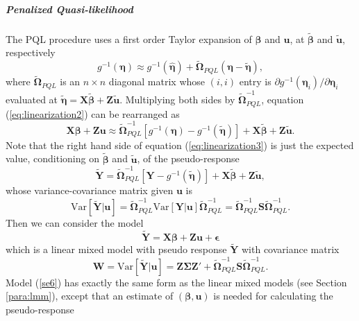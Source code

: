 \subparagraph*{Penalized Quasi-likelihood}
The PQL procedure uses a first order Taylor expansion of $\bm \beta$ and $\bm u$, at $\tilde{\bm
	\beta} $ and $ \tilde{\bm u} $, respectively
\begin{equation}\label{eq:linearization2}
	g^{-1}(\bm\eta) \approx g^{-1}(\hat{\bm \eta}) + \tilde{\bm \Omega}_{PQL}(\bm \eta-\tilde{\bm
		\eta}),
\end{equation} 
where $\tilde{\bm \Omega}_{PQL}$ is an $n\times n$ diagonal matrix whose $(i, i)$ entry is 
$\partial {g^{-1}(\bm \eta_i)}/\partial \bm \eta_i $ evaluated at $\tilde{\bm \eta}= \bm X\tilde{\bm
	\beta} + \bm Z\tilde{\bm u}$. Multiplying both sides by $\bm \tilde{\bm\Omega}_{PQL}^{-1}$,
equation
(\ref{eq:linearization2}) can be rearranged as 
\begin{equation}\label{eq:linearization3}
	\bm {X\beta} + \bm {Zu} \approx \tilde{\bm \Omega}_{PQL}^{-1}[g^{-1}(\bm\eta)- g^{-1}(\tilde{\bm
		\eta})]  + \bm{X}\tilde{\bm \beta} + \bm Z\tilde{\bm u}.
\end{equation}
Note that the right hand side of equation (\ref{eq:linearization3}) is just the expected value,
conditioning on $\tilde{\bm \beta}$ and $\tilde{\bm u}$, of the pseudo-response 
\begin{equation}\label{se4}
	\tilde{\bm Y }=\tilde{\bm \Omega}_{PQL}^{-1}[\bm Y- g^{-1}(\tilde{\bm \eta})]  + \bm{X}\tilde{\bm
		\beta} + \bm Z\tilde{\bm u},
\end{equation}
whose variance-covariance matrix given $\bm u$ is 
\begin{equation}\label{se5}
	\text{Var}[\tilde{\bm Y }|\bm u] =\tilde{\bm \Omega}_{PQL}^{-1} \text{Var}[\bm Y|\bm u]\tilde{\bm
		\Omega}_{PQL}^{-1} = 
	\tilde{\bm \Omega}_{PQL}^{-1} \bm S \tilde{\bm \Omega}_{PQL}^{-1}.
\end{equation}
Then we can consider the model 
\begin{equation}\label{se6}
	\tilde{\bm Y } = \bm{X\beta} + \bm {Zu}  + \bm \epsilon
\end{equation}
which is a linear mixed model with pseudo response $\tilde{\bm Y }$ with covariance matrix 
\begin{equation}
	\bm W = \text{Var}[ \tilde{\bm Y } |\bm u] = \bm{Z\Sigma Z'} + \tilde{\bm \Omega}_{PQL}^{-1} \bm S
	\tilde{\bm \Omega}_{PQL}^{-1}.
\end{equation}
Model (\ref{se6})  has exactly the same form as the linear mixed models (see Section 
\ref{para:lmm}),
except that an estimate of $(\bm\beta, \bm u)$  is needed for calculating the pseudo-response
